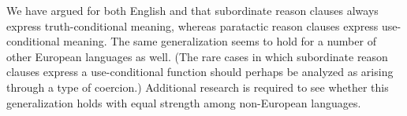 We have argued for both English and  that subordinate reason clauses always express truth-conditional meaning, whereas paratactic reason clauses express use-conditional meaning. The same generalization seems to hold for a number of other European languages as well. (The rare cases in which subordinate reason clauses express a use-conditional function should perhaps be analyzed as arising through a type of coercion.) Additional research is required to see whether this generalization holds with equal strength among non-European languages. 




